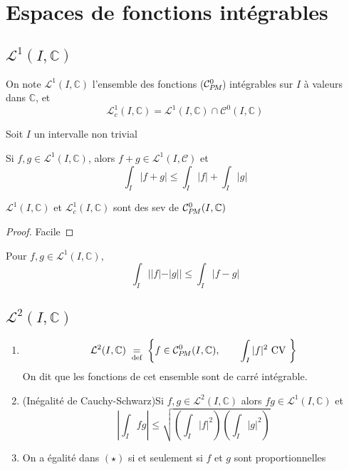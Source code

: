 \section{Espaces de fonctions intégrables}

\subsection{$\mathcal L^1(I, \mathbb C)$}

\begin{dfn}
    On note $\mathcal L^1(I, \mathbb C)$ l'ensemble des fonctions ($\CPM\!$) intégrables sur $I$ à valeurs dans $\mathbb C$, et \[\mathcal L^1_c(I, \mathbb C)=\mathcal L^1(I, \mathbb C)\cap \mathcal C^0(I, \mathbb C)\]
\end{dfn}

\begin{prop}
    \Hyp Soit $I$ un intervalle non trivial
    \begin{concenum}
    \item
        Si $f, g\in\mathcal L^1(I, \mathbb C)$, alors $f+g\in\mathcal L^1(I, \mathcal C)$ et \[
            \int_I|f+g|\leq \int_I|f|+\int_I|g|
        \]
    \item $\mathcal L^1(I, \mathbb C)$ et $\mathcal L^1_c(I, \mathbb C)$ sont des sev de $\CPM(I, \mathbb C)$
    \end{concenum}
\end{prop}
\begin{proof}
    Facile
\end{proof}

\begin{rem}
    Pour $f, g\in\mathcal L^1(I, \mathbb C)$, \[
        \int_I||f|-|g||\leq \int_I|f-g|
    \]
\end{rem}

\subsection{$\mathcal L^2(I, \mathbb C)$}

\begin{thmdef}
    \begin{enumerate}
        \item \[
                \mathcal L^2(I, \mathbb C)\defeq \left\{f\in\CPM(I, \mathbb C), \qquad \int_I|f|^2\text{ CV }\right\}
            \]
            On dit que les fonctions de cet ensemble sont de carré intégrable.
        \item (Inégalité de Cauchy-Schwarz)Si $f, g\in\mathcal L^2(I, \mathbb C)$ alors $fg\in\mathcal L^1(I, \mathbb C)$ et \[
                \left| \int_Ifg \right|\leq \sqrt{ \left( \int_I|f|^2 \right)  \left( \int_I|g|^2 \right)} \tag{$\star$}
            \]
        \item On a égalité dans $(\star)$ si et seulement si $f$ et $g$ sont proportionnelles
    \end{enumerate}
\end{thmdef}

